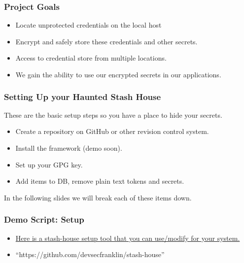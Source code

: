 \documentclass[aspectratio=169]{beamer}
\begin{document}
{
\begin{frame}
    \frametitle{Project Goals}
    \begin{itemize}
        \item Locate unprotected credentials on the local host
        \item Encrypt and safely store these credentials and other secrets.
        \item Access to credential store from multiple locations.
        \item We gain the ability to use our encrypted secrets in our applications.
    \end{itemize}


\end{frame}
}

\begin{frame}
    \frametitle{Setting Up your Haunted Stash House}
    These are the basic setup steps so you have a place to hide your secrets.
    \begin{itemize}
        \item Create a repository on GitHub or other revision control system.
        \item Install the framework (demo soon).
        \item Set up your GPG key.
        \item Add items to DB, remove plain text tokens and secrets.
    \end{itemize}
    In the following slides we will break each of these items down.
\end{frame}

\begin{frame}
    \frametitle{Demo Script: Setup}
    \begin{itemize}
        \item \href{ https://github.com/devsecfranklin/stash-house/blob/main/bin/install-client.sh }{Here is a stash-house setup tool that you can use/modify for your system. }
        \item ``https://github.com/devsecfranklin/stash-house''
    \end{itemize}
\end{frame}
\end{document}
